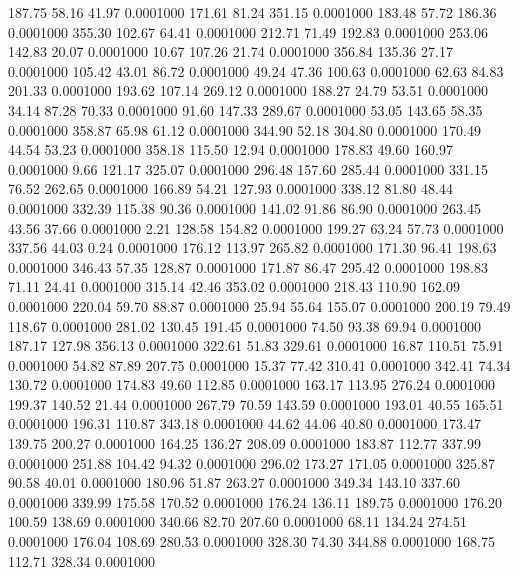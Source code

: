  187.75   58.16   41.97   0.0001000
 171.61   81.24  351.15   0.0001000
 183.48   57.72  186.36   0.0001000
 355.30  102.67   64.41   0.0001000
 212.71   71.49  192.83   0.0001000
 253.06  142.83   20.07   0.0001000
  10.67  107.26   21.74   0.0001000
 356.84  135.36   27.17   0.0001000
 105.42   43.01   86.72   0.0001000
  49.24   47.36  100.63   0.0001000
  62.63   84.83  201.33   0.0001000
 193.62  107.14  269.12   0.0001000
 188.27   24.79   53.51   0.0001000
  34.14   87.28   70.33   0.0001000
  91.60  147.33  289.67   0.0001000
  53.05  143.65   58.35   0.0001000
 358.87   65.98   61.12   0.0001000
 344.90   52.18  304.80   0.0001000
 170.49   44.54   53.23   0.0001000
 358.18  115.50   12.94   0.0001000
 178.83   49.60  160.97   0.0001000
   9.66  121.17  325.07   0.0001000
 296.48  157.60  285.44   0.0001000
 331.15   76.52  262.65   0.0001000
 166.89   54.21  127.93   0.0001000
 338.12   81.80   48.44   0.0001000
 332.39  115.38   90.36   0.0001000
 141.02   91.86   86.90   0.0001000
 263.45   43.56   37.66   0.0001000
   2.21  128.58  154.82   0.0001000
 199.27   63.24   57.73   0.0001000
 337.56   44.03    0.24   0.0001000
 176.12  113.97  265.82   0.0001000
 171.30   96.41  198.63   0.0001000
 346.43   57.35  128.87   0.0001000
 171.87   86.47  295.42   0.0001000
 198.83   71.11   24.41   0.0001000
 315.14   42.46  353.02   0.0001000
 218.43  110.90  162.09   0.0001000
 220.04   59.70   88.87   0.0001000
  25.94   55.64  155.07   0.0001000
 200.19   79.49  118.67   0.0001000
 281.02  130.45  191.45   0.0001000
  74.50   93.38   69.94   0.0001000
 187.17  127.98  356.13   0.0001000
 322.61   51.83  329.61   0.0001000
  16.87  110.51   75.91   0.0001000
  54.82   87.89  207.75   0.0001000
  15.37   77.42  310.41   0.0001000
 342.41   74.34  130.72   0.0001000
 174.83   49.60  112.85   0.0001000
 163.17  113.95  276.24   0.0001000
 199.37  140.52   21.44   0.0001000
 267.79   70.59  143.59   0.0001000
 193.01   40.55  165.51   0.0001000
 196.31  110.87  343.18   0.0001000
  44.62   44.06   40.80   0.0001000
 173.47  139.75  200.27   0.0001000
 164.25  136.27  208.09   0.0001000
 183.87  112.77  337.99   0.0001000
 251.88  104.42   94.32   0.0001000
 296.02  173.27  171.05   0.0001000
 325.87   90.58   40.01   0.0001000
 180.96   51.87  263.27   0.0001000
 349.34  143.10  337.60   0.0001000
 339.99  175.58  170.52   0.0001000
 176.24  136.11  189.75   0.0001000
 176.20  100.59  138.69   0.0001000
 340.66   82.70  207.60   0.0001000
  68.11  134.24  274.51   0.0001000
 176.04  108.69  280.53   0.0001000
 328.30   74.30  344.88   0.0001000
 168.75  112.71  328.34   0.0001000
